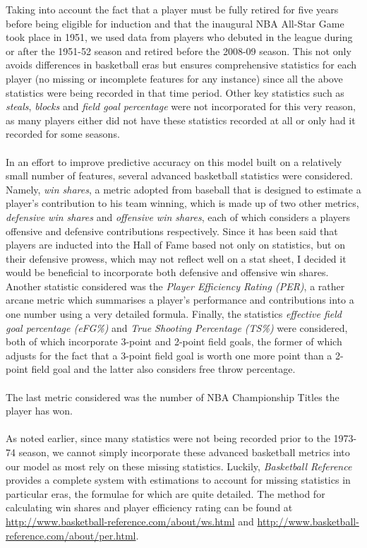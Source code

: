 \documentclass[paper=a4, fontsize=11pt]{scrartcl} %
\numberwithin{equation}{section} %
\numberwithin{figure}{section} %
\numberwithin{table}{section} %
\begin{document}
Taking into account the fact that a player must be fully retired for five years before being eligible for induction\cite{hof_guidelines} and that the inaugural NBA All-Star Game took place in 1951, we used data from players who debuted in the league during or after the 1951-52 season and retired before the 2008-09 season. This not only avoids differences in basketball eras but ensures comprehensive statistics for each player (no missing or incomplete features for any instance) since all the above statistics were being recorded in that time period. Other key statistics such as \textit{steals}, \textit{blocks} and \textit{field goal percentage} were not incorporated for this very reason, as many players either did not have these statistics recorded at all or only had it recorded for some seasons.\\ %
\\
In an effort to improve predictive accuracy on this model built on a relatively small number of features, several advanced basketball statistics were considered. Namely, \textit{win shares}, a metric adopted from baseball that is designed to estimate a player's contribution to his team winning, which is made up of two other metrics, \textit{defensive win shares} and \textit{offensive win shares}, each of which considers a players offensive and defensive contributions respectively. Since it has been said that players are inducted into the Hall of Fame based not only on statistics, but on their defensive prowess, which may not reflect well on a stat sheet, I decided it would be beneficial to incorporate both defensive and offensive win shares. Another statistic considered was the \textit{Player Efficiency Rating (PER)}, a rather arcane metric which summarises a player's performance and contributions into a one number using a very detailed formula. Finally, the statistics \textit{effective field goal percentage (eFG\%)} and \textit{True Shooting Percentage (TS\%)} were considered, both of which incorporate 3-point and 2-point field goals, the former of which adjusts for the fact that a 3-point field goal is worth one more point than a 2-point field goal and the latter also considers free throw percentage.\\
\\
The last metric considered was the number of NBA Championship Titles the player has won.\\
\\
As noted earlier, since many statistics were not being recorded prior to the 1973-74 season, we cannot simply incorporate these advanced basketball metrics into our model as most rely on these missing statistics. Luckily, \textit{Basketball Reference} provides a complete system with estimations to account for 	missing statistics in particular eras, the formulae for which are quite detailed. The method for calculating win shares and player efficiency rating can be found at \url{http://www.basketball-reference.com/about/ws.html} and \url{http://www.basketball-reference.com/about/per.html}.\\
\end{document}

